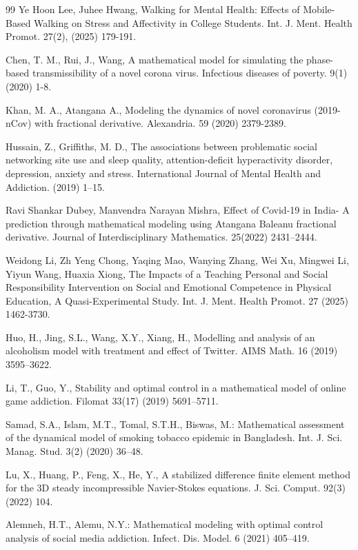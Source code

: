 \documentclass[10pt]{NSP1}
\begin{document}
\begin{thebibliography}{99}
		Ye Hoon Lee, Juhee Hwang, Walking for Mental Health: Effects of Mobile-Based Walking on Stress and Affectivity in College Students. Int. J. Ment. Health Promot. 27(2), (2025) 179-191.
		
		Chen, T. M., Rui, J., Wang, A mathematical model for simulating the phase-based transmissibility of a novel corona virus. Infectious diseases of poverty. 9(1)(2020) 1-8.
		
		Khan, M. A., Atangana A., Modeling the dynamics of novel coronavirus (2019-nCov) with fractional derivative. Alexandria. 59 (2020) 2379-2389.
		
		Hussain, Z., Griffiths, M. D., The associations between problematic social networking site use and sleep quality, attention-deficit hyperactivity disorder, depression, anxiety and stress. International Journal of Mental Health and Addiction. (2019) 1–15.
		
		Ravi Shankar Dubey, Manvendra Narayan Mishra, Effect of Covid-19 in India- A prediction through mathematical modeling using Atangana Baleanu fractional derivative. Journal of Interdisciplinary Mathematics. 25(2022) 2431–2444.
		
		Weidong Li, Zh Yeng Chong, Yaqing Mao, Wanying Zhang, Wei Xu, Mingwei Li, Yiyun Wang, Huaxia Xiong, The Impacts of a Teaching Personal and Social Responsibility Intervention on Social and Emotional Competence in Physical Education, A Quasi-Experimental Study. Int. J. Ment. Health Promot. 27 (2025) 1462-3730.
		
		Huo, H., Jing, S.L., Wang, X.Y., Xiang, H., Modelling and analysis of an alcoholism model with treatment and effect of Twitter. AIMS Math. 16 (2019) 3595–3622.
		
		Li, T., Guo, Y., Stability and optimal control in a mathematical model of online game addiction. Filomat 33(17) (2019) 5691–5711.
		
		Samad, S.A., Islam, M.T., Tomal, S.T.H., Biswas, M.: Mathematical assessment of the dynamical model of smoking tobacco epidemic in Bangladesh. Int. J. Sci. Manag. Stud. 3(2) (2020) 36–48.
		
		Lu, X., Huang, P., Feng, X., He, Y., A stabilized difference finite element method for the 3D steady incompressible Navier-Stokes equations. J. Sci. Comput. 92(3) (2022) 104.
		
		Alemneh, H.T., Alemu, N.Y.: Mathematical modeling with optimal control analysis of social media addiction. Infect. Dis. Model. 6 (2021) 405–419.
		

\end{thebibliography}
\end{document}
